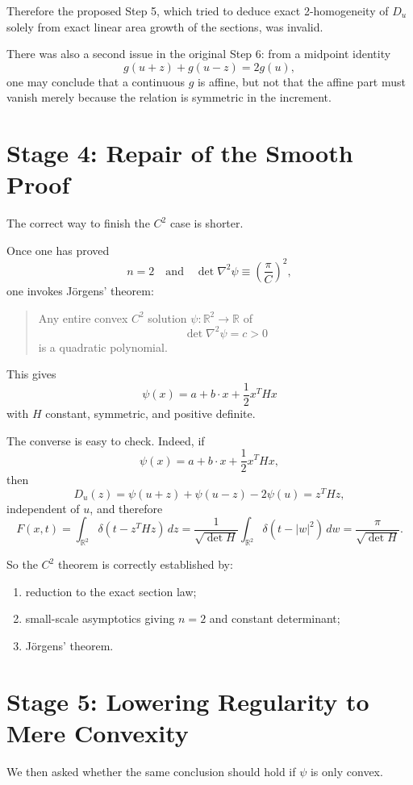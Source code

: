 \documentclass[11pt]{article}
\begin{document}
Therefore the proposed Step 5, which tried to deduce exact 2-homogeneity of $D_u$ solely from exact linear area growth of the sections, was invalid.

There was also a second issue in the original Step 6: from a midpoint identity
\[
g(u+z)+g(u-z)=2g(u),
\]
one may conclude that a continuous $g$ is affine, but not that the affine part must vanish merely because the relation is symmetric in the increment.

\section*{Stage 4: Repair of the Smooth Proof}

The correct way to finish the $C^2$ case is shorter.

Once one has proved
\[
n=2
\quad\text{and}\quad
\det \nabla^2\psi \equiv \left(\frac{\pi}{C}\right)^2,
\]
one invokes J\"orgens' theorem:

\begin{quote}
Any entire convex $C^2$ solution $\psi:\mathbb{R}^2\to\mathbb{R}$ of
\[
\det \nabla^2\psi = c>0
\]
is a quadratic polynomial.
\end{quote}

This gives
\[
\psi(x)=a+b\cdot x+\frac12 x^T Hx
\]
with $H$ constant, symmetric, and positive definite.

The converse is easy to check. Indeed, if
\[
\psi(x)=a+b\cdot x+\frac12 x^T Hx,
\]
then
\[
D_u(z)=\psi(u+z)+\psi(u-z)-2\psi(u)=z^THz,
\]
independent of $u$, and therefore
\[
F(x,t)=\int_{\mathbb{R}^2}\delta(t-z^THz)\,dz
=\frac{1}{\sqrt{\det H}}\int_{\mathbb{R}^2}\delta(t-|w|^2)\,dw
=\frac{\pi}{\sqrt{\det H}}.
\]

So the $C^2$ theorem is correctly established by:
\begin{enumerate}[label=\arabic*.]
\item reduction to the exact section law;
\item small-scale asymptotics giving $n=2$ and constant determinant;
\item J\"orgens' theorem.
\end{enumerate}

\section*{Stage 5: Lowering Regularity to Mere Convexity}

We then asked whether the same conclusion should hold if $\psi$ is only convex.
\end{document}

